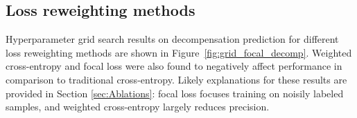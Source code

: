 \documentclass[nohyperref]{article}
\begin{document}
\begin{comment}
  \newpage
\begin{table}[t] \centering
    \caption{\textbf{Timestep-level performance with pivot bootstrap uncertainty estimation.} Recall is reported at a 50\% precision. Circulatory and respiratory failure are predicted on the HiB dataset, decompensation on M3B. In \textbf{bold}, we highlight best-performing methods).} \label{tab:perf_results-bs}
\resizebox{\textwidth}{!}{\begin{tabular}{lcccccc}
\toprule

 Task & \multicolumn{2}{c}{Circulatory Failure} & \multicolumn{2}{c}{Decompensation} & \multicolumn{2}{c}{Respiratory Failure} \\
 \cmidrule(lr){2-3} \cmidrule(lr){4-5}\cmidrule(lr){6-7}
Method &         AUPRC &   Recall &         AUPRC &   Recall &         AUPRC &   Recall\\
\midrule
Cross-entropy      &             39.3 $\pm$ 0.1 &             29.4 $\pm$ 0.1 &             34.6 $\pm$ 0.1 &             28.2 $\pm$ 0.1 &  $\mathbf{60.5}$ $\pm$ 0.0 &  $\mathbf{77.3}$ $\pm$ 0.0 \\
Multi-horizon \citep{tomavsev2019} &             39.8 $\pm$ 0.1 &             30.4 $\pm$ 0.1 &             35.0 $\pm$ 0.1 &             28.6 $\pm$ 0.1 &             60.2 $\pm$ 0.0 &             76.7 $\pm$ 0.0 \\
\textbf{Temporal Label Smoothing}     &  $\mathbf{40.8}$ $\pm$ 0.1 &  $\mathbf{32.4}$ $\pm$ 0.1 &  $\mathbf{35.6}$ $\pm$ 0.1 &  $\mathbf{29.3}$ $\pm$ 0.1 &             60.3 $\pm$ 0.0 &             77.1 $\pm$ 0.0 \\
\bottomrule
\end{tabular}}
\vspace{-0.5em}
\end{table}  
\end{comment}
\subsection{Loss reweighting methods}
\label{appendix:loss_reweight}

Hyperparameter grid search results on decompensation prediction for different loss reweighting methods are shown in Figure~\ref{fig:grid_focal_decomp}. Weighted cross-entropy and focal loss were also found to negatively affect performance in comparison to traditional cross-entropy. Likely explanations for these results are provided in Section \ref{sec:Ablations}: focal loss focuses training on noisily labeled samples, and weighted cross-entropy largely reduces precision.
\end{document}
